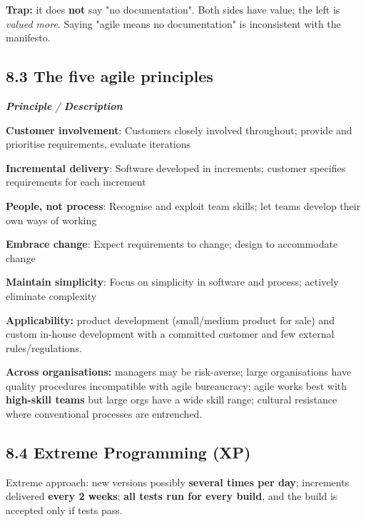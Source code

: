 \begin{studycolumns}
\begin{quote}
\end{quote}
\textbf{Trap:} it does \textbf{not} say "no documentation". Both sides have value; the left is \emph{valued more}. Saying "agile means no documentation" is inconsistent with the manifesto.

\subsection*{8.3 The five agile principles}

\begin{referenceentries}
\textit{\textbf{Principle} / \textbf{Description}}\par\smallskip
\noindent \textbf{\textbf{Customer involvement}}: Customers closely involved throughout; provide and prioritise requirements, evaluate iterations\par
\noindent \textbf{\textbf{Incremental delivery}}: Software developed in increments; customer specifies requirements for each increment\par
\noindent \textbf{\textbf{People, not process}}: Recognise and exploit team skills; let teams develop their own ways of working\par
\noindent \textbf{\textbf{Embrace change}}: Expect requirements to change; design to accommodate change\par
\noindent \textbf{\textbf{Maintain simplicity}}: Focus on simplicity in software and process; actively eliminate complexity\par
\end{referenceentries}
\textbf{Applicability:} product development (small/\allowbreak{}medium product for sale) and custom in-house development with a committed customer and few external rules/\allowbreak{}regulations.

\textbf{Across organisations:} managers may be risk-averse; large organisations have quality procedures incompatible with agile bureaucracy; agile works best with \textbf{high-skill teams} but large orgs have a wide skill range; cultural resistance where conventional processes are entrenched.

\subsection*{8.4 Extreme Programming (XP)}
Extreme approach: new versions possibly \textbf{several times per day}; increments delivered \textbf{every 2 weeks}; \textbf{all tests run for every build}, and the build is accepted only if tests pass.


\end{studycolumns}
